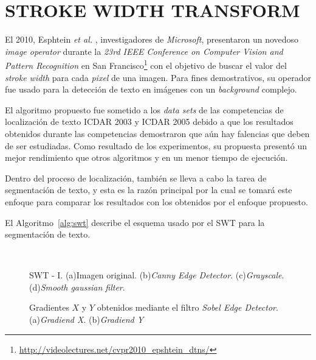 \chapter{STROKE WIDTH TRANSFORM}
\label{cap-swt}
El 2010, Esphtein \textit{et al.} \cite{Epshtein:SWT:2010}, investigadores de 
\textit{Microsoft}, presentaron un novedoso \textit{image operator} durante la
\textit{23rd IEEE Conference on Computer Vision and Pattern Recognition} en San
Francisco\footnote{\url{http://videolectures.net/cvpr2010_epshtein_dtns/}} con
el objetivo de buscar el valor del \textit{stroke width} para cada
\textit{pixel} de una imagen. Para fines demostrativos, su operador fue usado
para la detección de texto en imágenes con un \textit{background} complejo. 

El algoritmo propuesto fue sometido a los \textit{data sets} de las 
competencias de localización de texto ICDAR 2003 y ICDAR 2005\cite{ICDAR:web}
debido a que los resultados obtenidos durante las competencias demostraron que
aún hay falencias que deben de ser estudiadas. Como resultado de los
experimentos, su propuesta presentó un mejor rendimiento que otros algoritmos 
y en un menor tiempo de ejecución.

Dentro del proceso de localización, también se lleva a cabo la tarea de 
segmentación de texto, y esta es la razón principal por la cual se tomará este
enfoque para comparar los resultados con los obtenidos por el enfoque propuesto.

El Algoritmo~\ref{alg:swt} describe el esquema usado por el SWT para la 
segmentación de texto.


\clearpage
\begin{figure}
	\setlength{\fboxsep}{0pt}
   \\
   { }
	\caption[SWT - I]{SWT - I. (a)Imagen original. (b)\textit{Canny Edge 
	Detector}. (c)\textit{Grayscale}. (d)\textit{Smooth gaussian filter}.}
	\label{Fig:cap-swt:paso01}
\end{figure}

\begin{figure}
  \caption[SWT - II]{Gradientes $X$ y $Y$ obtenidos mediante el filtro 
  \textit{Sobel Edge Detector}. (a)\textit{Gradiend X}. (b)\textit{Gradiend Y}}
  \label{Fig:cap-swt:paso02}
\end{figure}

